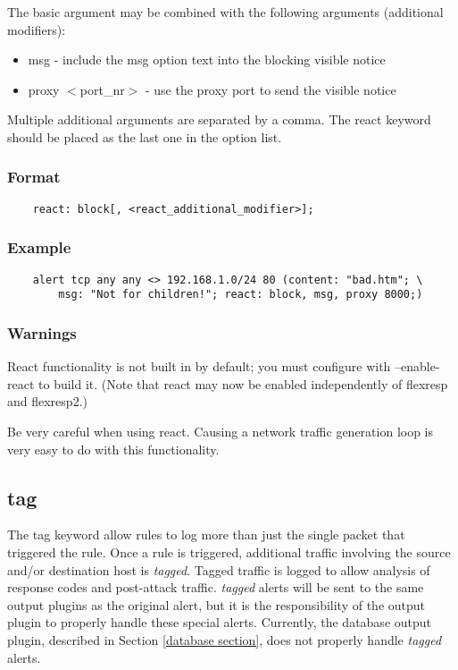 \documentclass[english]{report}
\begin{document}
The basic argument may be combined with the following arguments (additional
modifiers): 

\begin{itemize}
\item msg - include the msg option text into the blocking visible notice 
\item proxy $<$port\_nr$>$ - use the proxy port to send the visible notice
\end{itemize}

Multiple additional arguments are separated by a comma. The react keyword
should be placed as the last one in the option list.

\subsubsection{Format}

\begin{verbatim}
    react: block[, <react_additional_modifier>];
\end{verbatim}

\subsubsection{Example}

\begin{verbatim}
    alert tcp any any <> 192.168.1.0/24 80 (content: "bad.htm"; \
        msg: "Not for children!"; react: block, msg, proxy 8000;) 
\end{verbatim}

\subsubsection{Warnings}

React functionality is not built in by default; you must configure with
--enable-react to build it.  (Note that react may now be enabled independently
of flexresp and flexresp2.)

Be very careful when using react.  Causing a network traffic generation loop is
very easy to do with this functionality.

\subsection{tag}
\label{tag section}

The tag keyword allow rules to log more than just the single packet that
triggered the rule. Once a rule is triggered, additional traffic involving the
source and/or destination host is \emph{tagged}. Tagged traffic is logged to
allow analysis of response codes and post-attack traffic.  \emph{tagged} alerts
will be sent to the same output plugins as the original alert, but it is the
responsibility of the output plugin to properly handle these special alerts.
Currently, the database output plugin, described in Section \ref{database
section}, does not properly handle \emph{tagged} alerts.
\end{document}
